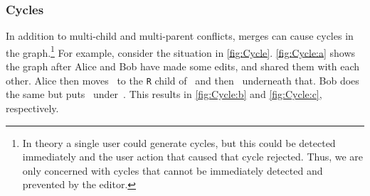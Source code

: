 



\subsubsection{Cycles}%
\label{sub:Multi-User Cycles}

\figureCycle{}

In addition to multi-child and multi-parent conflicts, merges
can cause cycles in the graph.\footnote{In theory a single user could
generate cycles, but this could be detected immediately and the user action
that caused that cycle rejected.
Thus, we are only concerned with cycles that cannot be immediately detected
and prevented by the editor.}
For example, consider the situation in \autoref{fig:Cycle}.
\autoref{fig:Cycle:a} shows the graph after Alice and Bob have made some edits,
and shared them with each other.
Alice then moves~\vMultiCycleTimes{} to the \texttt{R} child of~\vWrapPlus{}
and then~\vMultiCyclePlus{} underneath that.
Bob does the same but puts~\vMultiCycleTimes{} under~\vMultiCyclePlus{}.
This results in \autoref{fig:Cycle:b} and \autoref{fig:Cycle:c}, respectively.

